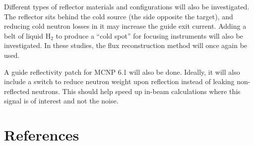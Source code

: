 \documentclass[a4paper]{jpconf}
\begin{document}
Different types of reflector materials and configurations will also be investigated.  The reflector sits behind the cold source (the side opposite the target), and reducing cold neutron losses in it may increase the guide exit current.  Adding a belt of liquid H$_2$ to produce a ``cold spot'' for focusing instruments will also be investigated.  In these studies, the flux reconstruction method will once again be used.

A guide reflectivity patch for MCNP 6.1 will also be done.  Ideally, it will also include a switch to reduce neutron weight upon reflection instead of leaking non-reflected neutrons. This should help speed up in-beam calculations where this signal is of interest and not the noise.

\section*{References}

\end{document}

